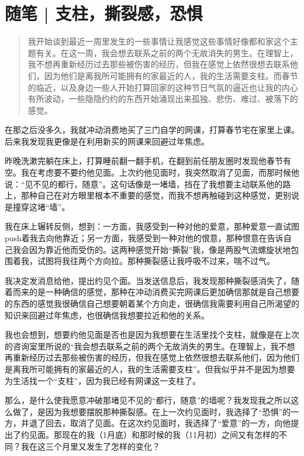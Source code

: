 \chapter{随笔 | 支柱，撕裂感，恐惧}





\blockquote{
    我开始谈到最近一周里发生的一些事情让我感觉这些事情好像都和家这个主题有关。在这一周，我会想去联系之前的两个无故消失的男生。在理智上，我不想再重新经历过去那些被伤害的经历，但我在感觉上依然很想去联系他们，因为他们是离我所可能拥有的家最近的人，我的生活需要支柱。而春节的临近，以及身边一些人开始打算回家的这种节日气氛的逼近也让我的内心有所波动，一些隐隐约约的东西开始涌现出来\pozhehao{}孤独、悲伤、难过、被落下的感觉。

}


在那之后没多久，我就冲动消费地买了三门自学的网课，打算春节宅在家里上课。后来我发现我更像是在利用新买的网课来回避过年焦虑。

昨晚洗漱完躺在床上，打算睡前翻一翻手机，在翻到前任朋友圈时发现他春节有空。我在考虑要不要约他见面。上次约他见面时，我突然取消了见面，而那时候他说：“见不见的都行，随意”。这句话像是一堵墙，挡在了我想要主动联系他的路上，那种自己在对方眼里根本不重要的感觉，而我不想再触碰到这种感觉，更别说是撞穿这堵“墙”。

我在床上辗转反侧，想到：一方面，我感受到一种对他的爱意，那种爱意一直试图push着我去向他靠近；另一方面，我感受到一种对他的恨意，那种恨意在告诉自己我会因为靠近他而受伤的。这两种感觉开始“撕裂”我，像是两股气流螺旋状地包围着我，试图将我往两个方向拉。那种撕裂感让我呼吸不过来，喘不过气。

我决定发消息给他，提出约见个面。当发送信息后，我发现那种撕裂感消失了，随着而来的是一种确信的感觉，那种在冲动消费买完网课后更加确信那就是自己想要的东西的感觉\pozhehao{}我很确信自己想要朝着某个方向走，很确信我需要利用自己所渴望的知识来回避过年焦虑，也很确信我想要拉近和他的关系。

我也会想到，想要约他见面是否也是因为我想要在生活里找个支柱，就像是在上次的咨询室里所说的\pozhehao{}“我会想去联系之前的两个无故消失的男生。在理智上，我不想再重新经历过去那些被伤害的经历，但我在感觉上依然很想去联系他们，因为他们是离我所可能拥有的家最近的人，我的生活需要支柱”。但我似乎并不是因为想要为生活找一个“支柱”，因为我已经有网课这一支柱了。

那么，是什么使我愿意冲破那堵见不见的“都行，随意”的墙呢？我发现我之所以这么做了，是因为我想要摆脱那种撕裂感。在上一次约见面时，我选择了“恐惧”的一方，并退了回去，取消了见面。在这次约见面时，我选择了“爱意”的一方，向他提出了约见面。那现在的我（1月底）和那时候的我（11月初）之间又有怎样的不同？我在这三个月里又发生了怎样的变化？

